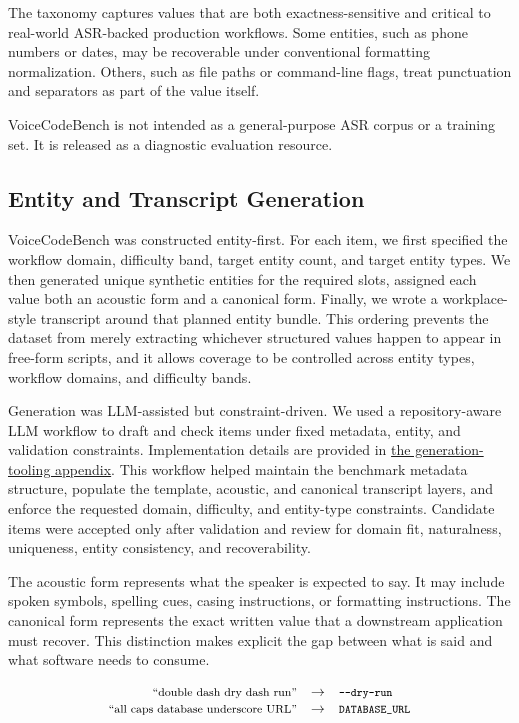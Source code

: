 \documentclass[10pt,twocolumn]{article}
\begin{document}
The taxonomy captures values that are both exactness-sensitive and critical to
real-world ASR-backed production workflows. Some entities, such as phone 
numbers or dates, may be recoverable under conventional formatting 
normalization. Others, such as file paths or command-line flags, treat 
punctuation and separators as part of the value itself.

VoiceCodeBench is not intended as a general-purpose ASR corpus or a
training set. It is released as a diagnostic evaluation resource.

\subsection{Entity and Transcript
	Generation}\label{entity-transcript-generation}

VoiceCodeBench was constructed entity-first. For each item, we first
specified the workflow domain, difficulty band, target entity count,
and target entity types. We then generated unique synthetic entities for
the required slots, assigned each value both an acoustic form and a
canonical form. Finally, we wrote a workplace-style transcript around
that planned entity bundle. This ordering prevents the dataset from
merely extracting whichever structured values happen to appear in
free-form scripts, and it allows coverage to be controlled across
entity types, workflow domains, and difficulty bands.

Generation was LLM-assisted but constraint-driven. We used a
repository-aware LLM workflow to draft and check items under fixed
metadata, entity, and validation constraints. Implementation details are
provided in \hyperref[appendix-generation-tooling]{the generation-tooling
	appendix}. This workflow helped maintain the benchmark
metadata structure, populate the template, acoustic, and canonical
transcript layers, and enforce the requested domain, difficulty, and
entity-type constraints. Candidate items were accepted only after
validation and review for domain fit, naturalness, uniqueness, entity
consistency, and recoverability.

The acoustic form represents what the speaker is expected to say. It
may include spoken symbols, spelling cues, casing instructions, or
formatting instructions. The canonical form represents the exact written
value that a downstream application must recover. This distinction makes
explicit the gap between what is said and what software needs to
consume.

\[
	\begin{array}{@{}rcl@{}}
		\text{\footnotesize ``double dash dry dash run''}         & \rightarrow &
		\text{\footnotesize\texttt{-\kern0pt-dry-run}}                                  \\
		\text{\footnotesize ``all caps database underscore URL''} & \rightarrow &
		\text{\footnotesize\texttt{DATABASE\_URL}}
	\end{array}
\]
\end{document}
